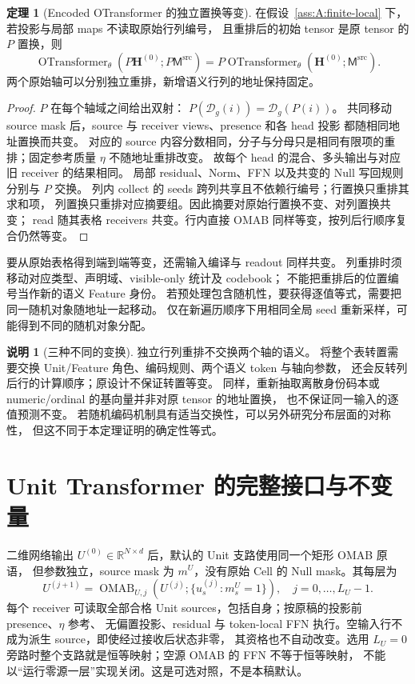 \documentclass[11pt,UTF8,fontset=fandol]{ctexart}
\numberwithin{equation}{section}
\theoremstyle{definition}
\newtheorem{theorem}[definition]{定理}
\newtheorem{remark}[definition]{说明}
\newcommand{\Dset}{\mathcal D}
\newcommand{\OTransformer}{\operatorname{OTransformer}}
\begin{document}
\begin{theorem}[Encoded OTransformer 的独立置换等变]
\label{thm:A:equivariance}
在假设~\ref{ass:A:finite-local} 下，若投影与局部 maps 不读取原始行列编号，
且重排后的初始 tensor 是原 tensor 的 $P$ 置换，则
\begin{equation}
  \OTransformer_\theta(P\bm H^{(0)};P\mathsf M^{\mathrm{src}})
   =P\OTransformer_\theta(\bm H^{(0)};\mathsf M^{\mathrm{src}}).
  \label{eq:A:equivariance}
\end{equation}
两个原始轴可以分别独立重排，新增语义行列的地址保持固定。
\end{theorem}
\begin{proof}
$P$ 在每个轴域之间给出双射：
$P(\Dset_g(i))=\Dset_g(P(i))$。
共同移动 source mask 后，source 与 receiver views、presence 和各 head 投影
都随相同地址置换而共变。
对应的 source 内容分数相同，分子与分母只是相同有限项的重排；固定参考质量 $\eta$ 不随地址重排改变。
故每个 head 的混合、多头输出与对应旧 receiver 的结果相同。
局部 residual、Norm、FFN 以及共变的 Null 写回规则分别与 $P$ 交换。
列内 collect 的 seeds 跨列共享且不依赖行编号；行置换只重排其求和项，
列置换只重排对应摘要组。因此摘要对原始行置换不变、对列置换共变；
read 随其表格 receivers 共变。行内直接 OMAB 同样等变，按列后行顺序复合仍然等变。
\end{proof}

要从原始表格得到端到端等变，还需输入编译与 readout 同样共变。
列重排时须移动对应类型、声明域、visible-only 统计及 codebook；
不能把重排后的位置编号当作新的语义 Feature 身份。
若预处理包含随机性，要获得逐值等式，需要把同一随机对象随地址一起移动。
仅在新遍历顺序下用相同全局 seed 重新采样，可能得到不同的随机对象分配。

\begin{remark}[三种不同的变换]
独立行列重排不交换两个轴的语义。
将整个表转置需要交换 Unit/Feature 角色、编码规则、两个语义 token 与轴向参数，
还会反转列后行的计算顺序；原设计不保证转置等变。
同样，重新抽取离散身份码本或 numeric/ordinal 的基向量并非对原 tensor 的地址置换，
也不保证同一输入的逐值预测不变。
若随机编码机制具有适当交换性，可以另外研究分布层面的对称性，
但这不同于本定理证明的确定性等式。
\end{remark}



\section{Unit Transformer 的完整接口与不变量}
\label{v51:app:unit}
二维网络输出 $U^{(0)}\in\mathbb R^{N\times d}$ 后，默认的 Unit 支路使用同一个矩形 OMAB 原语，
但参数独立，source mask 为 $m^U$，没有原始 Cell 的 Null mask。其每层为
\begin{equation}
 U^{(j+1)}=\operatorname{OMAB}_{U,j}
 \left(U^{(j)};\{u_s^{(j)}:m_s^U=1\}\right),\quad j=0,\ldots,L_U-1.
 \label{v51:eq:unit-block}
\end{equation}
每个 receiver 可读取全部合格 Unit sources，包括自身；按原稿的投影前 presence、$\eta$ 参考、
无偏置投影、residual 与 token-local FFN 执行。空输入行不成为派生 source，即使经过接收后状态非零，
其资格也不自动改变。选用 $L_U=0$ 旁路时整个支路就是恒等映射；空源 OMAB 的 FFN 不等于恒等映射，
不能以“运行零源一层”实现关闭。这是可选对照，不是本稿默认。
\end{document}
